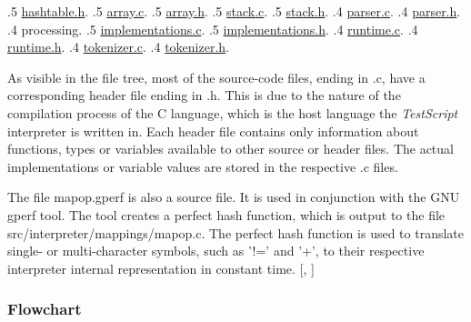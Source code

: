 \documentclass[12pt,a4paper]{article}
\newcommand{\hr}[2]{\hyperref[#2]{#1}}
\newcommand{\name}{\emph{TestScript}}
\begin{document}
\begin{minipage}{\textwidth}
{\begin{flushleft}
{                    .5 \hr{hashtable.h}{src/interpreter/memory/hashtable.h}.
                    .5 \hr{array.c}{src/interpreter/memory/array.c}.
                    .5 \hr{array.h}{src/interpreter/memory/array.h}.
                    .5 \hr{stack.c}{src/interpreter/memory/stack.c}.
                    .5 \hr{stack.h}{src/interpreter/memory/stack.h}.
                .4 \hr{parser.c}{src/interpreter/parser.c}.
                .4 \hr{parser.h}{src/interpreter/parser.h}.
                .4 processing.
                    .5 \hr{implementations.c}{src/interpreter/processing/implementations.c}.
                    .5 \hr{implementations.h}{src/interpreter/processing/implementations.h}.
                .4 \hr{runtime.c}{src/interpreter/runtime.c}.
                .4 \hr{runtime.h}{src/interpreter/runtime.h}.
                .4 \hr{tokenizer.c}{src/interpreter/tokenizer.c}.
                .4 \hr{tokenizer.h}{src/interpreter/tokenizer.h}.
    }
\end{flushleft}}

\end{minipage}
\linebreak

As visible in the file tree, most of the source-code files, ending in .c,
have a corresponding header file ending in .h. This is due to the nature
of the compilation process of the C language, which is the host language
the \name{} interpreter is written in.
Each header file contains only information about functions, types or variables
available to other source or header files. The actual implementations or 
variable values are stored in the respective .c files.


The file mapop.gperf is also a source file. It is used in conjunction with the GNU gperf
tool. The tool creates a perfect hash function, which is output to the file
src/interpreter/mappings/mapop.c. The perfect hash function is used to translate
single- or multi-character symbols, such as '!=' and '+', to their respective
interpreter internal representation in constant time.
[, ]

\subsubsection{Flowchart}
\end{document}
